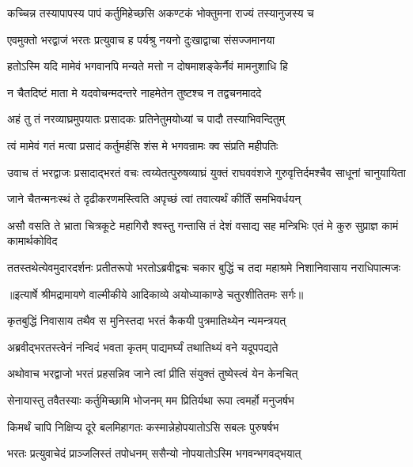 \twolineshloka
{कच्चिन्न तस्यापापस्य पापं कर्तुमिहेच्छसि}
{अकण्टकं भोक्तुमना राज्यं तस्यानुजस्य च} %

\twolineshloka
{एवमुक्तो भरद्वाजं भरतः प्रत्युवाच ह}
{पर्यश्रु नयनो दुःखाद्वाचा संसज्जमानया} %

\twolineshloka
{हतोऽस्मि यदि मामेवं भगवानपि मन्यते}
{मत्तो न दोषमाशङ्केर्नैवं मामनुशाधि हि} %

\twolineshloka
{न चैतदिष्टं माता मे यदवोचन्मदन्तरे}
{नाहमेतेन तुष्टश्च न तद्वचनमाददे} %

\twolineshloka
{अहं तु तं नरव्याघ्रमुपयातः प्रसादकः}
{प्रतिनेतुमयोध्यां च पादौ तस्याभिवन्दितुम्} %

\twolineshloka
{त्वं मामेवं गतं मत्वा प्रसादं कर्तुमर्हसि}
{शंस मे भगवन्रामः क्व संप्रति महीपतिः} %

\threelineshloka
{उवाच तं भरद्वाजः प्रसादाद्भरतं वचः}
{त्वय्येतत्पुरुषव्याघ्रं युक्तं राघववंशजे}
{गुरुवृत्तिर्दमश्चैव साधूनां चानुयायिता} %

\twolineshloka
{जाने चैतन्मनःस्थं ते दृढीकरणमस्त्विति}
{अपृच्छं त्वां तवात्यर्थं कीर्तिं समभिवर्धयन्} %

\threelineshloka
{असौ वसति ते भ्राता चित्रकूटे महागिरौ}
{श्वस्तु गन्तासि तं देशं वसाद्य सह मन्त्रिभिः}
{एतं मे कुरु सुप्राज्ञ कामं कामार्थकोविद} %

\fourlineindentedshloka
{ततस्तथेत्येवमुदारदर्शनः}
{ प्रतीतरूपो भरतोऽब्रवीद्वचः}
{चकार बुद्धिं च तदा महाश्रमे}
{ निशानिवासाय नराधिपात्मजः} %


{॥इत्यार्षे श्रीमद्रामायणे वाल्मीकीये आदिकाव्ये अयोध्याकाण्डे चतुरशीतितमः सर्गः॥}


\twolineshloka
{कृतबुद्धिं निवासाय तथैव स मुनिस्तदा}
{भरतं कैकयी पुत्रमातिथ्येन न्यमन्त्रयत्} %

\twolineshloka
{अब्रवीद्भरतस्त्वेनं नन्विदं भवता कृतम्}
{पाद्यमर्घ्यं तथातिथ्यं वने यदूपपद्यते} %

\twolineshloka
{अथोवाच भरद्वाजो भरतं प्रहसन्निव}
{जाने त्वां प्रीति संयुक्तं तुष्येस्त्वं येन केनचित्} %

\twolineshloka
{सेनायास्तु तवैतस्याः कर्तुमिच्छामि भोजनम्}
{मम प्रितिर्यथा रूपा त्वमर्हो मनुजर्षभ} %

\twolineshloka
{किमर्थं चापि निक्षिप्य दूरे बलमिहागतः}
{कस्मान्नेहोपयातोऽसि सबलः पुरुषर्षभ} %

\twolineshloka
{भरतः प्रत्युवाचेदं प्राञ्जलिस्तं तपोधनम्}
{ससैन्यो नोपयातोऽस्मि भगवन्भगवद्भयात्} %

